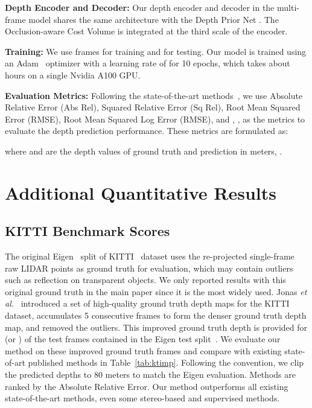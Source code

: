 \documentclass[runningheads]{llncs}
\newcommand{\etal}{\textit{et al.}}
\begin{document}
\begin{center}
\textbf{Depth Encoder and Decoder:} Our depth encoder and decoder in the multi-frame model  shares the same architecture with the Depth Prior Net . The Occlusion-aware Cost Volume is integrated at the third scale of the encoder.

\textbf{Training:} We use frames  for training and  for testing. Our model is trained using an Adam~\cite{adam} optimizer with a learning rate of  for 10 epochs, which takes about  hours on a single Nvidia A100 GPU.

\textbf{Evaluation Metrics:} Following the state-of-the-art methods~\cite{monodepth2,packnet,featdepth}, we use Absolute Relative Error (Abs Rel), Squared Relative Error (Sq Rel), Root Mean Squared Error (RMSE), Root Mean Squared Log Error (RMSE), and , ,  as the metrics to evaluate the depth prediction performance. These metrics are formulated as:


 
 
  
  
where  and  are the depth values of ground truth and prediction in meters, .

\section{Additional Quantitative Results}


\subsection{KITTI Benchmark Scores}
The original Eigen~\cite{eigen-split} split of KITTI~\cite{kitti} dataset uses the re-projected single-frame raw LIDAR points as ground truth for evaluation, which may contain outliers such as reflection on transparent objects. We only reported results with this original ground truth in the main paper since it is the most widely used. Jonas \etal~\cite{kitti2017} introduced a set of high-quality ground truth depth maps for the KITTI dataset, accumulates 5 consecutive frames to form the denser ground truth depth map, and removed the outliers. This improved ground truth depth is provided for  (or ) of the  test frames contained in the Eigen test split~\cite{eigen-split}. We evaluate our method on these  improved ground truth frames and compare with existing state-of-art published methods in Table~\ref{tab:ktimp}. Following the convention, we clip the predicted depths to 80 meters to match the Eigen evaluation. Methods are ranked by the Absolute Relative Error. Our method outperforms all existing state-of-the-art methods, even some stereo-based and supervised methods.


\end{center}
\end{document}
